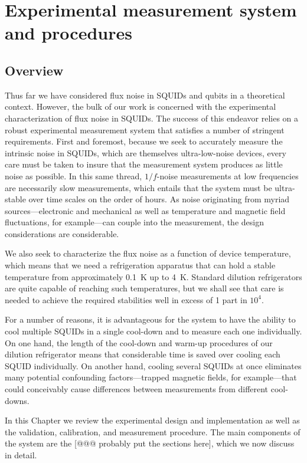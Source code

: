 \chapter{Experimental measurement system and procedures}
\label{chap.experimental}

\section{Overview}

Thus far we have considered flux noise in SQUIDs and qubits in a theoretical context. However, the bulk of our work is concerned with the experimental characterization of flux noise in SQUIDs. The success of this endeavor relies on a robust experimental measurement system that satisfies a number of stringent requirements. First and foremost, because we seek to accurately measure the intrinsic noise in SQUIDs, which are themselves ultra-low-noise devices, every care must be taken to insure that the measurement system produces as little noise as possible. In this same thread, $1/f$-noise measurements at low frequencies are necessarily slow measurements, which entails that the system must be ultra-stable over time scales on the order of hours. As noise originating from myriad sources---electronic and mechanical as well as temperature and magnetic field fluctuations, for example---can couple into the measurement, the design considerations are considerable.

We also seek to characterize the flux noise as a function of device temperature, which means that we need a refrigeration apparatus that can hold a stable temperature from approximately 0.1~K up to 4~K. Standard dilution refrigerators are quite capable of reaching such temperatures, but we shall see that care is needed to achieve the required stabilities well in excess of 1 part in $10^4$.

For a number of reasons, it is advantageous for the system to have the ability to cool multiple SQUIDs in a single cool-down and to measure each one individually. On one hand, the length of the cool-down and warm-up procedures of our dilution refrigerator means that considerable time is saved over cooling each SQUID individually. On another hand, cooling several SQUIDs at once eliminates many potential confounding factors---trapped magnetic fields, for example---that could conceivably cause differences between measurements from different cool-downs.

In this Chapter we review the experimental design and implementation as well as the validation, calibration, and measurement procedure. The main components of the system are the [@@@ probably put the sections here], which we now discuss in detail.

